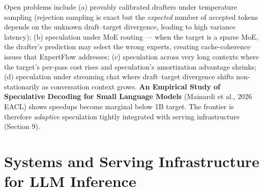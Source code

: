 \documentclass{article}
\begin{document}
Open problems include (a) provably calibrated drafters under temperature sampling (rejection sampling is exact but the \emph{expected} number of accepted tokens depends on the unknown draft--target divergence, leading to high variance latency); (b) speculation under MoE routing --- when the target is a sparse MoE, the drafter's prediction may select the wrong experts, creating cache-coherence issues that ExpertFlow addresses; (c) speculation across very long contexts where the target's per-pass cost rises and speculation's amortization advantage shrinks; (d) speculation under streaming chat where draft--target divergence shifts non-stationarily as conversation context grows. \textbf{An Empirical Study of Speculative Decoding for Small Language Models} (Mainardi et al., 2026 EACL) shows speedups become marginal below 1B target. The frontier is therefore \emph{adaptive} speculation tightly integrated with serving infrastructure (Section 9).

\section{Systems and Serving Infrastructure for LLM Inference}\label{systems-and-serving-infrastructure-for-llm-inference}
\end{document}
